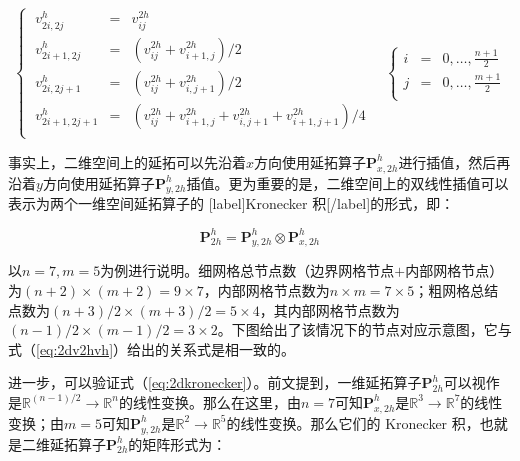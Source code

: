 \documentclass[12pt, UTF8, nofonts]{ctexart}
\begin{document}
\begin{equation}
  \label{eq:2dv2hvh}
  \left\{\; \begin{array}{lcl}
    v_{2i,2j}^{h} &=& v_{ij}^{2h} \\
    v_{2i+1,2j}^{h} &=& \left(v_{ij}^{2h} + v_{i+1,j}^{2h}\right) \big/ 2 \\
    v_{2i,2j+1}^{h} &=& \left(v_{ij}^{2h} + v_{i,j+1}^{2h}\right) \big/ 2 \\
    v_{2i+1,2j+1}^{h} &=& \left(v_{ij}^{2h} + v_{i+1,j}^{2h} + v_{i,j+1}^{2h} + v_{i+1,j+1}^{2h} \right) \big/ 4 \\
  \end{array} \right. \quad
  \left\{ \begin{array}{lcl}
    i &=& 0,\ldots,\frac{n+1}{2} \\
    j &=& 0,\ldots,\frac{m+1}{2} \\
  \end{array} \right.
\end{equation}

事实上，二维空间上的延拓可以先沿着$x$方向使用延拓算子$\boldsymbol{P}_{x,2h}^{h}$进行插值，然后再沿着$y$方向使用延拓算子$\boldsymbol{P}_{y,2h}^{h}$插值。更为重要的是，二维空间上的双线性插值可以表示为两个一维空间延拓算子的 [label]Kronecker 积[/label]的形式，即：

\begin{equation}
  \label{eq:2dkronecker}
  \boldsymbol{P}_{2h}^{h} = \boldsymbol{P}_{y,2h}^{h} \otimes \boldsymbol{P}_{x,2h}^{h}
\end{equation}

以$n=7,m=5$为例进行说明。细网格总节点数（边界网格节点$+$内部网格节点）为$(n+2)\times(m+2)=9\times7$，内部网格节点数为$n \times m=7\times5$；粗网格总结点数为$(n+3)/2 \times (m+3)/2=5\times4$，其内部网格节点数为$(n-1)/2\times(m-1)/2=3\times2$。下图给出了该情况下的节点对应示意图，它与式（\ref{eq:2dv2hvh}）给出的关系式是相一致的。

进一步，可以验证式（\ref{eq:2dkronecker}）。前文提到，一维延拓算子$\boldsymbol{P}_{2h}^{h}$可以视作是$\mathbb{R}^{(n-1)/2}\to\mathbb{R}^{n}$的线性变换。那么在这里，由$n=7$可知$\boldsymbol{P}_{x,2h}^{h}$是$\mathbb{R}^{3}\to\mathbb{R}^{7}$的线性变换；由$m=5$可知$\boldsymbol{P}_{y,2h}^{h}$是$\mathbb{R}^{2}\to\mathbb{R}^{5}$的线性变换。那么它们的 Kronecker 积，也就是二维延拓算子$\boldsymbol{P}_{2h}^{h}$的矩阵形式为：
\end{document}
